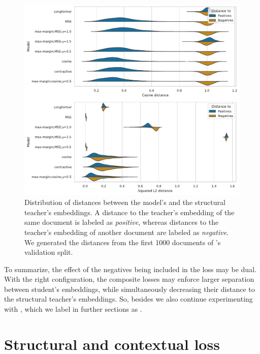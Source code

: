 \begin{figure}
  \includegraphics[width=\textwidth]{img/composite_distances.pdf}

  \caption{Distribution of distances between the model's and the structural
  teacher's embeddings. A distance to the teacher's embedding of the same
  document is labeled as \emph{positive}, whereas distances to the teacher's
  embedding of another document are labeled as \emph{negative}. We generated
  the distances from the first 1000 documents of 's
  validation split.}

  \label{fig:composite_distances}

\end{figure}

To summarize, the effect of the negatives being included in the loss may be
dual. With the right configuration, the composite losses may enforce larger
separation between student's embeddings, while simultaneously decreasing their
distance to the structural teacher's embeddings. So, besides
 we also continue experimenting with
, which we label in further sections as
.

\section{Structural and contextual loss}\label{section:structural_and_contextual}

